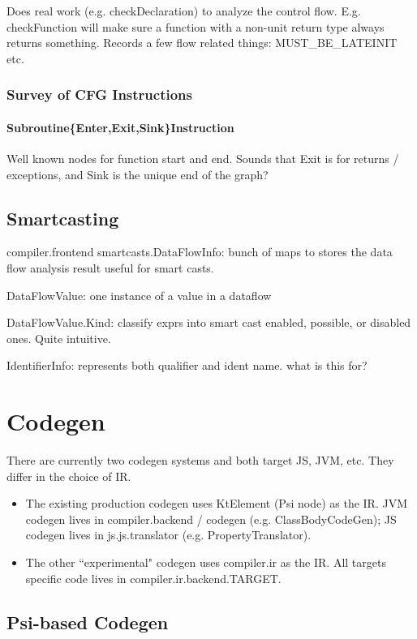 \documentclass{article}
\begin{document}
Does real work (e.g. checkDeclaration) to analyze the control flow. E.g. checkFunction will make sure a function with a non-unit return type always returns something. Records a few flow related things: MUST\_BE\_LATEINIT etc.

\subsubsection{Survey of CFG Instructions}

\paragraph{Subroutine\{Enter,Exit,Sink\}Instruction} Well known nodes for function start and end. Sounds that Exit is for returns / exceptions, and Sink is the unique end of the graph?

\subsection{Smartcasting}

compiler.frontend smartcasts.DataFlowInfo: bunch of maps to stores the data flow analysis result useful for smart casts.

DataFlowValue: one instance of a value in a dataflow

DataFlowValue.Kind: classify exprs into smart cast enabled, possible, or disabled ones. Quite intuitive.

IdentifierInfo: represents both qualifier and ident name. what is this for?

\section{Codegen}

There are currently two codegen systems and both target JS, JVM, etc. They differ in the choice of IR.

\begin{itemize}
    \item The existing production codegen uses KtElement (Psi node) as the IR. JVM codegen lives in compiler.backend / codegen (e.g. ClassBodyCodeGen); JS codegen lives in js.js.translator (e.g. PropertyTranslator).
    \item The other ``experimental" codegen uses compiler.ir as the IR. All targets specific code lives in compiler.ir.backend.TARGET.
\end{itemize}

\subsection{Psi-based Codegen}
\end{document}
